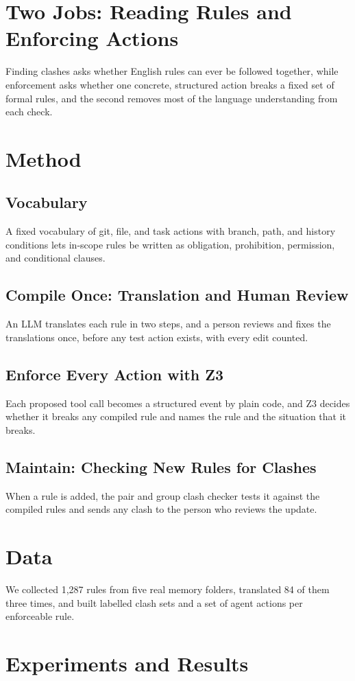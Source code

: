 \documentclass[11pt]{article}
\begin{document}
\section{Two Jobs: Reading Rules and Enforcing Actions}
Finding clashes asks whether English rules can ever be followed together, while enforcement
asks whether one concrete, structured action breaks a fixed set of formal rules, and the
second removes most of the language understanding from each check.

\section{Method}
\subsection{Vocabulary}
A fixed vocabulary of git, file, and task actions with branch, path, and history conditions
lets in-scope rules be written as obligation, prohibition, permission, and conditional clauses.
\subsection{Compile Once: Translation and Human Review}
An LLM translates each rule in two steps, and a person reviews and fixes the translations once,
before any test action exists, with every edit counted.
\subsection{Enforce Every Action with Z3}
Each proposed tool call becomes a structured event by plain code, and Z3 decides whether it
breaks any compiled rule and names the rule and the situation that it breaks.
\subsection{Maintain: Checking New Rules for Clashes}
When a rule is added, the pair and group clash checker tests it against the compiled rules and
sends any clash to the person who reviews the update.

\section{Data}
We collected 1,287 rules from five real memory folders, translated 84 of them three times, and
built labelled clash sets and a set of agent actions per enforceable rule.

\section{Experiments and Results}
\end{document}
